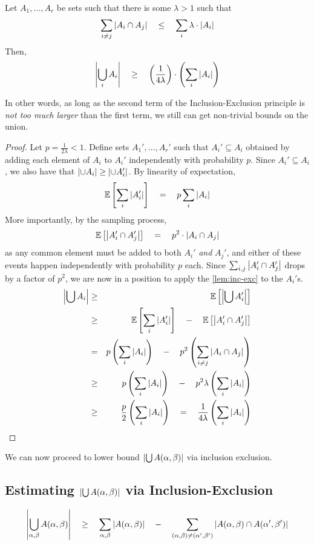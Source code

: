 \begin{lemma}\label{lem:str-inc-exc}
Let $A_1,\dots, A_r$ be sets such that there is some $\lambda > 1$ such that
\[
\sum_{i\neq j} \left|A_i \cap A_j\right| \quad \leq \quad \sum_i \lambda \cdot \left|A_i\right|
\]
Then, 
\[
\left|\bigcup_i A_i\right| \quad \geq \quad \left(\frac{1}{4\lambda}\right) \cdot \left(\sum_i \left|A_i\right|\right)
\]
\end{lemma}

In other words, as long as the second term of the Inclusion-Exclusion principle is \emph{not too much larger} than the first term, we still can get non-trivial bounds on the union. 

\begin{proof}
Let $p = \frac{1}{2\lambda} < 1$. Define sets $A_1',\dots, A_r'$ such that $A_i' \subseteq A_i$ obtained by adding each element of $A_i$ to $A_i'$ independently with probability $p$. Since $A_i' \subseteq A_i$, we also have that $\left|\cup A_i\right| \geq \left|\cup  A_i'\right|$. By linearity of expectation, 
\[
\mathbb{E}\left[\sum_i \left|A_i'\right|\right] \quad = \quad p \sum_{i} \left|A_i\right| 
\]
More importantly, by the sampling process,
\[
\mathbb{E}\left[\left|A_i' \cap A_j'\right|\right] \quad = \quad p^2 \cdot \left|A_i \cap A_j\right|
\]
as any common element must be added to both $A_i'$ \emph{and} $A_j'$, and either of these events happen independently with probability $p$ each. Since $\sum_{i,j}\left|A_i' \cap A_j'\right|$ drops by a factor of $p^2$, we are now in a position to apply the \autoref{lem:inc-exc} to the $A_i'$s. 
\begin{eqnarray*}
\left|\bigcup A_i\right| & \geq &  \mathbb{E}\left[\left|\bigcup A_i'\right|\right]\\
& \geq & \mathbb{E}\left[\sum_i \left|A_i'\right|\right] \quad - \quad \mathbb{E}\left[\left|A_i' \cap A_j'\right|\right]\\
& = & p \left(\sum_i \left|A_i\right|\right) \quad - \quad p^2\left(\sum_{i\neq j}\left|A_i \cap A_j\right|\right)\\
& \geq & p \left(\sum_i \left|A_i\right|\right) \quad - \quad p^2 \lambda \left(\sum_i \left|A_i\right|\right)\\
& \geq & \frac{p}{2} \left(\sum_i \left|A_i\right|\right) \quad = \quad \frac{1}{4\lambda} \left(\sum_i \left|A_i\right|\right)
\end{eqnarray*}
\end{proof}

We can now proceed to lower bound $\left|\bigcup A(\alpha, \beta)\right|$ via inclusion exclusion.

\subsection*{Estimating $\left|\bigcup A(\alpha, \beta)\right|$ via Inclusion-Exclusion}
\[
\left|\bigcup_{\alpha, \beta}A(\alpha,\beta)\right|\quad \geq \quad \sum_{\alpha,\beta}\left|A(\alpha, \beta)\right| \quad - \quad \sum_{(\alpha, \beta)\neq (\alpha',\beta')}\left|A(\alpha, \beta) \cap A(\alpha',\beta')\right|
\]

